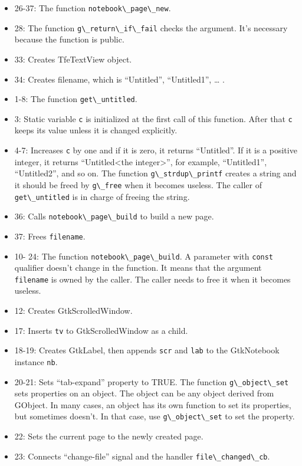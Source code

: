 \begin{itemize}
\tightlist
\item
  26-37: The function \passthrough{\lstinline!notebook\_page\_new!}.
\item
  28: The function \passthrough{\lstinline!g\_return\_if\_fail!} checks
  the argument. It's necessary because the function is public.
\item
  33: Creates TfeTextView object.
\item
  34: Creates filename, which is ``Untitled'', ``Untitled1'', \ldots{} .
\item
  1-8: The function \passthrough{\lstinline!get\_untitled!}.
\item
  3: Static variable \passthrough{\lstinline!c!} is initialized at the
  first call of this function. After that \passthrough{\lstinline!c!}
  keeps its value unless it is changed explicitly.
\item
  4-7: Increases \passthrough{\lstinline!c!} by one and if it is zero,
  it returns ``Untitled''. If it is a positive integer, it returns
  ``Untitled\textless the integer\textgreater{}'', for example,
  ``Untitled1'', ``Untitled2'', and so on. The function
  \passthrough{\lstinline!g\_strdup\_printf!} creates a string and it
  should be freed by \passthrough{\lstinline!g\_free!} when it becomes
  useless. The caller of \passthrough{\lstinline!get\_untitled!} is in
  charge of freeing the string.
\item
  36: Calls \passthrough{\lstinline!notebook\_page\_build!} to build a
  new page.
\item
  37: Frees \passthrough{\lstinline!filename!}.
\item
  10- 24: The function \passthrough{\lstinline!notebook\_page\_build!}.
  A parameter with \passthrough{\lstinline!const!} qualifier doesn't
  change in the function. It means that the argument
  \passthrough{\lstinline!filename!} is owned by the caller. The caller
  needs to free it when it becomes useless.
\item
  12: Creates GtkScrolledWindow.
\item
  17: Inserts \passthrough{\lstinline!tv!} to GtkScrolledWindow as a
  child.
\item
  18-19: Creates GtkLabel, then appends \passthrough{\lstinline!scr!}
  and \passthrough{\lstinline!lab!} to the GtkNotebook instance
  \passthrough{\lstinline!nb!}.
\item
  20-21: Sets ``tab-expand'' property to TRUE. The function
  \passthrough{\lstinline!g\_object\_set!} sets properties on an object.
  The object can be any object derived from GObject. In many cases, an
  object has its own function to set its properties, but sometimes
  doesn't. In that case, use \passthrough{\lstinline!g\_object\_set!} to
  set the property.
\item
  22: Sets the current page to the newly created page.
\item
  23: Connects ``change-file'' signal and the handler
  \passthrough{\lstinline!file\_changed\_cb!}.
\end{itemize}

